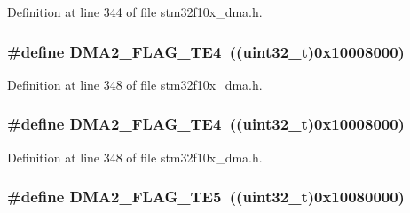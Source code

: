 Definition at line 344 of file stm32f10x\+\_\+dma.\+h.

\subsubsection[{\texorpdfstring{D\+M\+A2\+\_\+\+F\+L\+A\+G\+\_\+\+T\+E4}{DMA2_FLAG_TE4}}]{\setlength{\rightskip}{0pt plus 5cm}\#define D\+M\+A2\+\_\+\+F\+L\+A\+G\+\_\+\+T\+E4~(({\bf uint32\+\_\+t})0x10008000)}\hypertarget{group___d_m_a__flags__definition_gac1178b804cad45fe82236dbd2c25cc64}{}\label{group___d_m_a__flags__definition_gac1178b804cad45fe82236dbd2c25cc64}


Definition at line 348 of file stm32f10x\+\_\+dma.\+h.

\subsubsection[{\texorpdfstring{D\+M\+A2\+\_\+\+F\+L\+A\+G\+\_\+\+T\+E4}{DMA2_FLAG_TE4}}]{\setlength{\rightskip}{0pt plus 5cm}\#define D\+M\+A2\+\_\+\+F\+L\+A\+G\+\_\+\+T\+E4~(({\bf uint32\+\_\+t})0x10008000)}\hypertarget{group___d_m_a__flags__definition_gac1178b804cad45fe82236dbd2c25cc64}{}\label{group___d_m_a__flags__definition_gac1178b804cad45fe82236dbd2c25cc64}


Definition at line 348 of file stm32f10x\+\_\+dma.\+h.

\subsubsection[{\texorpdfstring{D\+M\+A2\+\_\+\+F\+L\+A\+G\+\_\+\+T\+E5}{DMA2_FLAG_TE5}}]{\setlength{\rightskip}{0pt plus 5cm}\#define D\+M\+A2\+\_\+\+F\+L\+A\+G\+\_\+\+T\+E5~(({\bf uint32\+\_\+t})0x10080000)}\hypertarget{group___d_m_a__flags__definition_gae57659b4349d03eb70db63bb2aa40505}{}\label{group___d_m_a__flags__definition_gae57659b4349d03eb70db63bb2aa40505}


